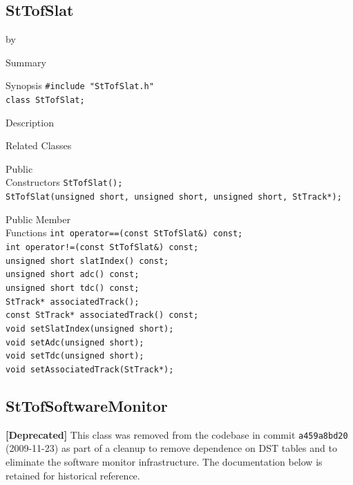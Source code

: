 \documentclass[twoside]{article}
\newcommand{\entrylabel}[1]{\mbox{\textbf{{#1}}}\hfil}%
\newenvironment{entry}
{\begin{list}{}%
    {\renewcommand{\makelabel}{\entrylabel}%
     \setlength{\labelwidth}{90pt}%
     \setlength{\leftmargin}{\labelwidth}
     \advance\leftmargin by \labelsep%
      }%
    }%
  {\end{list}}
\newcommand{\Entrylabel}[1]%
{\raisebox{0pt}[1ex][0pt]{\makebox[\labelwidth][l]%
    {\parbox[t]{\labelwidth}{\hspace{0pt}\textbf{{#1}}}}}}
\newenvironment{Entry}%
{\renewcommand{\entrylabel}{\Entrylabel}\begin{entry}}%
  {\end{entry}}
\begin{document}
\subsection{StTofSlat}
\label{sec:StTofSlat}
\begin{Entry}
\item[Summary]
\item[Synopsis]
    \verb+#include "StTofSlat.h"+\\
    \verb+class StTofSlat;+\\
\item[Description]
\item[Related Classes]
\item[Public\\ Constructors]
    \verb+StTofSlat();+\\
    \verb+StTofSlat(unsigned short, unsigned short, unsigned short, StTrack*);+\\
\item[Public Member\\ Functions]
    \verb+int operator==(const StTofSlat&) const;+\\
    \verb+int operator!=(const StTofSlat&) const;+\\
    \verb+unsigned short slatIndex() const;+\\
    \verb+unsigned short adc() const;+\\
    \verb+unsigned short tdc() const;+\\
    \verb+StTrack* associatedTrack();+\\
    \verb+const StTrack* associatedTrack() const;+\\
    \verb+void setSlatIndex(unsigned short);+\\
    \verb+void setAdc(unsigned short);+\\
    \verb+void setTdc(unsigned short);+\\
    \verb+void setAssociatedTrack(StTrack*);+\\
\end{Entry}
\clearpage

\subsection{StTofSoftwareMonitor}
\label{sec:StTofSoftwareMonitor}
\textbf{[Deprecated]} This class was removed from the codebase in commit
\texttt{a459a8bd20} (2009-11-23) as part of a cleanup to remove dependence on
DST tables and to eliminate the software monitor infrastructure.
The documentation below is retained for historical reference.
\end{document}
